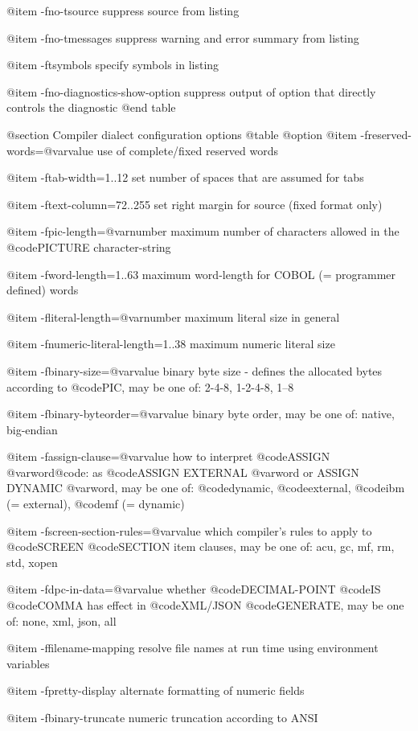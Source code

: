 @item -fno-tsource
suppress source from listing

@item -fno-tmessages
suppress warning and error summary from listing

@item -ftsymbols
specify symbols in listing

@item -fno-diagnostics-show-option
suppress output of option that directly
controls the diagnostic
@end table

@section Compiler dialect configuration options
@table @option
@item -freserved-words=@var{value}
use of complete/fixed reserved words

@item -ftab-width=1..12
set number of spaces that are assumed for tabs

@item -ftext-column=72..255
set right margin for source (fixed format only)

@item -fpic-length=@var{number}
maximum number of characters allowed in the @code{PICTURE} character-string

@item -fword-length=1..63
maximum word-length for COBOL (= programmer defined) words

@item -fliteral-length=@var{number}
maximum literal size in general

@item -fnumeric-literal-length=1..38
maximum numeric literal size

@item -fbinary-size=@var{value}
binary byte size - defines the allocated bytes according to @code{PIC}, may be one of: 2-4-8, 1-2-4-8, 1--8

@item -fbinary-byteorder=@var{value}
binary byte order, may be one of: native, big-endian

@item -fassign-clause=@var{value}
how to interpret @code{ASSIGN @var{word}@code{: as @code{ASSIGN EXTERNAL @var{word}} or }ASSIGN DYNAMIC @var{word}}, may be one of: @code{dynamic}, @code{external}, @code{ibm} (= external), @code{mf} (= dynamic)

@item -fscreen-section-rules=@var{value}
which compiler's rules to apply to @code{SCREEN} @code{SECTION} item clauses, may be one of: acu, gc, mf, rm, std, xopen

@item -fdpc-in-data=@var{value}
whether @code{DECIMAL-POINT} @code{IS} @code{COMMA} has effect in @code{XML/JSON} @code{GENERATE}, may be one of: none, xml, json, all

@item -ffilename-mapping
resolve file names at run time using environment variables

@item -fpretty-display
alternate formatting of numeric fields

@item -fbinary-truncate
numeric truncation according to ANSI

